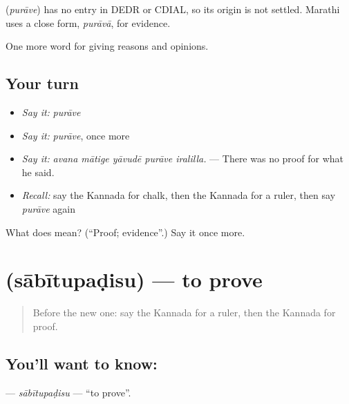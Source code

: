 \begin{cousinweb}
\textbf{} (\emph{purāve}) has no entry in DEDR or CDIAL, so its origin is not settled. Marathi uses a close form, \emph{purāvā}, for evidence.
\end{cousinweb}

\begin{grammarlens}[title={What you've built}]
One more word for giving reasons and opinions.
\end{grammarlens}

\subsection*{Your turn}
\begin{itemize}
\raggedright
  \item \emph{Say it:} \emph{purāve}
  \item \emph{Say it:} \emph{purāve}, once more
  \item \emph{Say it:} \emph{avana mātige yāvudē purāve iralilla.} — There was no proof for what he said.
  \item \emph{Recall:} say the Kannada for chalk, then the Kannada for a ruler, then say \emph{purāve} again
\end{itemize}

\begin{tcolorbox}[breakable,colback=teal!4,colframe=teal!35!black,title={Before you move on}]
What does  mean? (\textquotedblleft{}Proof; evidence\textquotedblright{}.) Say it once more.
\end{tcolorbox}
\section[\texorpdfstring{\kn{ಸಾಬೀತುಪಡಿಸು} (sābītupaḍisu)}{ಸಾಬೀತುಪಡಿಸು (sābītupaḍisu)}]{ (sābītupaḍisu) — to prove}

\label{lesson:KA-C376-sabitupadisu}



\begin{quote}
Before the new one: say the Kannada for a ruler, then the Kannada for proof.
\end{quote}

\subsection*{You'll want to know: }
\textbf{} — \emph{sābītupaḍisu} — \textquotedblleft{}to prove\textquotedblright{}.


